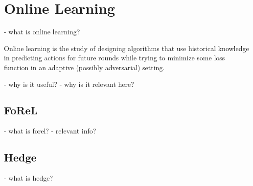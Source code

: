 \section{Online Learning}

- what is online learning?

Online learning is the study of designing algorithms that use historical knowledge in predicting
actions for future rounds while trying to minimize some loss function in an adaptive (possibly
adversarial) setting.

- why is it useful?
- why is it relevant here?

\subsection{FoReL}\label{sec:forel}
- what is forel?
- relevant info?

\subsection{Hedge}
- what is hedge?
